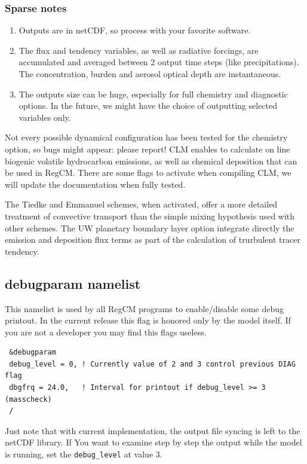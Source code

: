 \subsubsection{Sparse notes}

\begin{enumerate}
  \item Outputs are in netCDF, so process with your favorite software.
  \item The flux and tendency variables, as well as radiative forcings,
    are accumulated and averaged between 2 output time steps (like
    precipitations). The concentration, burden and aerosol optical depth
    are instantaneous.
  \item The outputs size can be huge, especially for full chemistry and
    diagnostic options. In the future, we might have the choice of outputting
    selected variables only.
\end{enumerate}

Not every possible dynamical configuration has been tested for the chemistry
option, so bugs might appear: please report!
CLM enables to calculate on line biogenic volatile hydrocarbon emissions, as
well as chemical deposition that can be used in RegCM. There are some flags to
activate when compiling CLM, we will update the documentation when fully tested.

The Tiedke and Emmanuel schemes, when activated, offer a more detailed
treatment of convective transport than the simple mixing hypothesis used with
other schemes.
The UW planetary boundary layer option integrate directly the emission and
deposition flux terms as part of the calculation of trurbulent tracer tendency.

\subsection{debugparam namelist}

This namelist is used by all RegCM programs to enable/disable some debug
printout.  In the current release this flag is honored only by the model
itself. If you are not a developer you may find this flags useless.

{\footnotesize
\begin{Verbatim}
 &debugparam
 debug_level = 0, ! Currently value of 2 and 3 control previous DIAG flag
 dbgfrq = 24.0,   ! Interval for printout if debug_level >= 3 (masscheck)
 /
\end{Verbatim}
}

Just note that with current implementation, the output file syncing is left
to the netCDF library. If You want to examine step by step the output while
the model is running, set the \verb=debug_level= at value 3.

